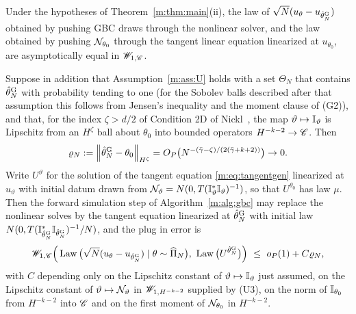 \begin{corollary}\label{m:cor:commute}
Under the hypotheses of Theorem~\ref{m:thm:main}(ii), the law of $\sqrt N(u_\theta-u_{\hat\theta^{\rm G}_N})$ obtained by pushing GBC draws through the nonlinear solver, and the law obtained by pushing $\mathcal{N}_{\theta_0}$ through the tangent linear equation linearized at $u_{\theta_0}$, are asymptotically equal in $\mathscr{W}_{1,\mathscr{C}}$.

Suppose in addition that Assumption~\ref{m:ass:U} holds with a set $\Theta_N$ that contains $\hat\theta^{\rm G}_N$ with probability tending to one (for the Sobolev balls described after that assumption this follows from Jensen's inequality and the moment clause of (G2)), and that, for the index $\zeta>d/2$ of Condition 2D of Nickl~\cite{nicklbvm2024}, the map $\vartheta\mapsto\mathbb{I}_\vartheta$ is Lipschitz from an $H^\zeta$ ball about $\theta_0$ into bounded operators $H^{-k-2}\to\mathscr{C}$. Then
\begin{equation}\label{m:eq:plugin}
\varrho_N:=\left\|\hat\theta^{\rm G}_N-\theta_0\right\|_{H^\zeta}=O_P\big(N^{-(\bar\gamma-\zeta)/(2(\bar\gamma+k+2))}\big)\to0 .
\end{equation}
Write $U^\vartheta$ for the solution of the tangent equation \eqref{m:eq:tangentgen} linearized at $u_\vartheta$ with initial datum drawn from $\mathcal{N}_\vartheta=N(0,T(\mathbb{I}^*_\vartheta\mathbb{I}_\vartheta)^{-1})$, so that $U^{\theta_0}$ has law $\mu$. Then the forward simulation step of Algorithm~\ref{m:alg:gbc} may replace the nonlinear solves by the tangent equation linearized at $\hat\theta^{\rm G}_N$ with initial law $N(0,T(\mathbb{I}^*_{\hat\theta^{\rm G}_N}\mathbb{I}_{\hat\theta^{\rm G}_N})^{-1}/N)$, and the plug in error is
\[
\Wone_{1,\Ccal}\Big(\Law\big(\sqrt N(u_\theta-u_{\hat\theta^{\rm G}_N})\mid\theta\sim\Pihat\big),\ \Law\big(U^{\hat\theta^{\rm G}_N}\big)\Big)\ \le\ o_P(1)+C\varrho_N ,
\]
with $C$ depending only on the Lipschitz constant of $\vartheta\mapsto\mathbb{I}_\vartheta$ just assumed, on the Lipschitz constant of $\vartheta\mapsto\mathcal{N}_\vartheta$ in $\mathscr{W}_{1,H^{-k-2}}$ supplied by (U3), on the norm of $\mathbb{I}_{\theta_0}$ from $H^{-k-2}$ into $\mathscr{C}$ and on the first moment of $\mathcal{N}_{\theta_0}$ in $H^{-k-2}$.
\end{corollary}

